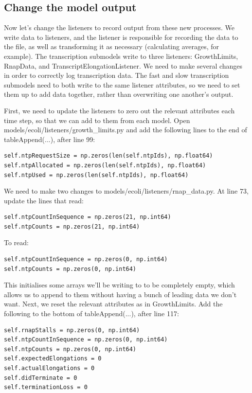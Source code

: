 \documentclass[12pt]{article}
\begin{document}
\subsection{Change the model output}

Now let’s change the listeners to record output from these new processes. We write data to listeners, and the listener is responsible for recording the data to the file, as well as transforming it as necessary (calculating averages, for example). The transcription submodels write to three listeners: GrowthLimits, RnapData, and TranscriptElongationListener. We need to make several changes in order to correctly log transcription data. The fast and slow transcription submodels need to both write to the same listener attributes, so we need to set them up to add data together, rather than overwriting one another's output.

First, we need to update the listeners to zero out the relevant attributes each time step, so that we can add to them from each model. Open models/ecoli/listeners/growth_limits.py and add the following lines to the end of tableAppend(...), after line 99:

\lstset{language=Python}
\begin{lstlisting}
self.ntpRequestSize = np.zeros(len(self.ntpIds), np.float64)
self.ntpAllocated = np.zeros(len(self.ntpIds), np.float64)
self.ntpUsed = np.zeros(len(self.ntpIds), np.float64)
\end{lstlisting}

We need to make two changes to models/ecoli/listeners/rnap_data.py. At line 73, update the lines that read:
\lstset{language=Python}
\begin{lstlisting}
self.ntpCountInSequence = np.zeros(21, np.int64)
self.ntpCounts = np.zeros(21, np.int64)
\end{lstlisting}

To read:
\lstset{language=Python}
\begin{lstlisting}
self.ntpCountInSequence = np.zeros(0, np.int64)
self.ntpCounts = np.zeros(0, np.int64)
\end{lstlisting}

This initialises some arrays we'll be writing to to be completely empty, which allows us to append to them without having a bunch of leading data we don't want. Next, we reset the relevant attributes as in GrowthLimits. Add the following to the bottom of tableAppend(...), after line 117:
\lstset{language=Python}
\begin{lstlisting}
self.rnapStalls = np.zeros(0, np.int64)
self.ntpCountInSequence = np.zeros(0, np.int64)
self.ntpCounts = np.zeros(0, np.int64)
self.expectedElongations = 0
self.actualElongations = 0
self.didTerminate = 0
self.terminationLoss = 0
\end{lstlisting}
\end{document}
